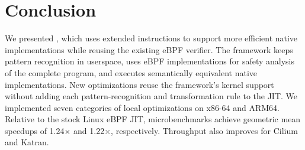 \section{Conclusion}
\label{sec:conclusion}

We presented \tool, which uses extended instructions to support more efficient native implementations while reusing the existing eBPF verifier. The framework keeps pattern recognition in userspace, uses eBPF implementations for safety analysis of the complete program, and executes semantically equivalent native implementations. New optimizations reuse the framework's kernel support without adding each pattern-recognition and transformation rule to the JIT. We implemented seven categories of local optimizations on x86-64 and ARM64. Relative to the stock Linux eBPF JIT, microbenchmarks achieve geometric mean speedups of 1.24$\times$ and 1.22$\times$, respectively. Throughput also improves for Cilium and Katran.
